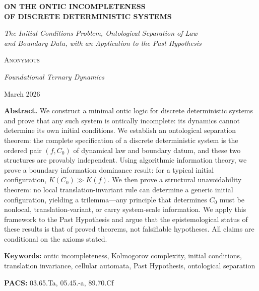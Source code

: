 \documentclass[12pt]{article}
\theoremstyle{plain}
\theoremstyle{definition}
\theoremstyle{remark}
\begin{document}
\begin{center}
{\Large\bfseries ON THE ONTIC INCOMPLETENESS\\[4pt] OF DISCRETE DETERMINISTIC SYSTEMS}

\vspace{12pt}
{\itshape The Initial Conditions Problem, Ontological Separation of Law\\
and Boundary Data, with an Application to the Past Hypothesis}

\vspace{16pt}
{\scshape Anonymous}

\vspace{4pt}
{\itshape Foundational Ternary Dynamics}

\vspace{4pt}
March 2026
\end{center}

\vspace{12pt}

\noindent\textbf{Abstract.}
We construct a minimal ontic logic for discrete deterministic systems and prove that any such system is ontically incomplete: its dynamics cannot determine its own initial conditions. We establish an ontological separation theorem: the complete specification of a discrete deterministic system is the ordered pair $(f, C_0)$ of dynamical law and boundary datum, and these two structures are provably independent. Using algorithmic information theory, we prove a boundary information dominance result: for a typical initial configuration, $K(C_0) \gg K(f)$. We then prove a structural unavoidability theorem: no local translation-invariant rule can determine a generic initial configuration, yielding a trilemma---any principle that determines $C_0$ must be nonlocal, translation-variant, or carry system-scale information. We apply this framework to the Past Hypothesis and argue that the epistemological status of these results is that of proved theorems, not falsifiable hypotheses. All claims are conditional on the axioms stated.

\vspace{6pt}
\noindent\textbf{Keywords:} ontic incompleteness, Kolmogorov complexity, initial conditions, translation invariance, cellular automata, Past Hypothesis, ontological separation

\vspace{6pt}
\noindent\textbf{PACS:} 03.65.Ta, 05.45.-a, 89.70.Cf

\vspace{14pt}
\end{document}
